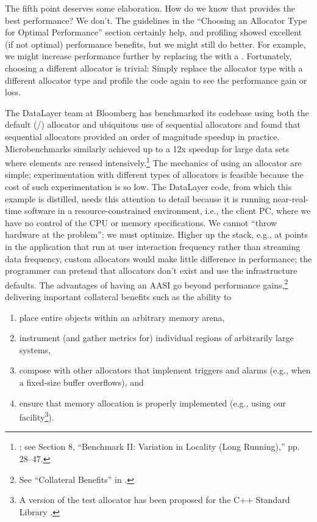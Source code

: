 The fifth point deserves some elaboration. How do we know that
 provides the best performance? We don’t. The
guidelines in the “Choosing an Allocator Type for Optimal Performance” section
certainly help, and profiling showed excellent (if not optimal) performance
benefits, but we might still do better. For example, we might increase
performance further by replacing the  with a
. Fortunately, choosing a different allocator is trivial:
Simply replace the allocator type with a different allocator type and profile the
code again to see the performance gain or loss.

The DataLayer team at Bloomberg has benchmarked its codebase using both
the default (/) allocator and ubiquitous use of sequential allocators
and found that sequential allocators provided an order of magnitude speedup
in practice. Microbenchmarks similarly achieved up to a 12x speedup for large
data sets where elements are reused intensively.\footnote{\cite{lakos16}; see Section 8, “Benchmark II: Variation
  in Locality (Long Running),” pp. 28–47.} The mechanics of using an
allocator are simple; experimentation with different types of allocators is
feasible because the cost of such experimentation is so low.
The DataLayer code, from which this example is distilled, needs this attention
to detail because it is running near-real-time software in a
resource-constrained environment, i.e., the client PC, where we have no control of the
CPU or memory specifications. We cannot “throw hardware at the problem”; we
must optimize. Higher up the stack, e.g., at points in the application that run
at user interaction frequency rather than streaming data frequency, custom
allocators would make little difference in performance; the programmer can
pretend that allocators don’t exist and use the infrastructure defaults.
The advantages of having an AASI go beyond performance gains,\footnote{See “Collateral Benefits” in \cite{halpern20a}.} delivering
important collateral benefits such as the ability to
\begin{enumerate}
\item place entire objects within an arbitrary memory arena,
\item instrument (and gather metrics for) individual regions of arbitrarily large
systems,
\item compose with other allocators that implement triggers and alarms (e.g.,
when a fixed-size buffer overflows), and
\item ensure that memory allocation is properly implemented (e.g., using our
 facility\footnote{A version of the test allocator has been proposed for the C++ Standard Library \cite{feher18}.}).
\end{enumerate}

